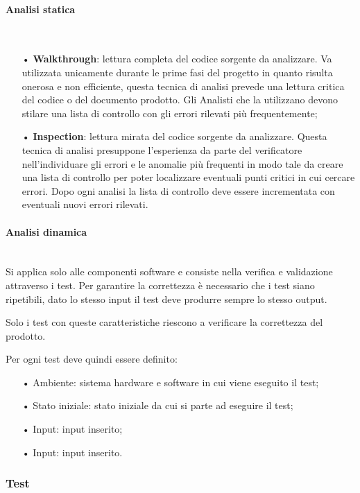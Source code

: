 \paragraph{Analisi statica}\mbox{}\\
\begin{itemize}
\item[•] \textbf{Walkthrough}: lettura completa del codice sorgente da analizzare. Va utilizzata unicamente durante le prime fasi del progetto in quanto risulta onerosa e non efficiente, questa tecnica di analisi prevede una lettura critica del codice o del documento prodotto. Gli Analisti che la utilizzano devono stilare una lista di controllo con gli errori rilevati più frequentemente;
\item[•] \textbf{Inspection}: lettura mirata del codice sorgente da analizzare. Questa tecnica di analisi presuppone l’esperienza da parte del verificatore nell’individuare gli errori e le anomalie più frequenti in modo tale da creare una lista di controllo per poter localizzare eventuali punti critici in cui cercare errori. Dopo ogni analisi la lista di controllo deve essere incrementata con eventuali nuovi errori rilevati.
\end{itemize}

\paragraph{Analisi dinamica}\mbox{}\\
Si applica solo alle componenti software e consiste nella verifica e validazione attraverso i test. Per garantire la correttezza è necessario che i test siano ripetibili, dato lo stesso input il test deve produrre sempre lo stesso output.  

Solo i test con queste caratteristiche riescono a verificare la correttezza del prodotto.

Per ogni test deve quindi essere definito: 
\begin{itemize}
\item[•] Ambiente: sistema hardware e software in cui viene eseguito il test; 
\item[•]Stato iniziale: stato iniziale da cui si parte ad eseguire il test; 
\item[•] Input: input inserito;
\item[•] Input: input inserito.
\end{itemize}

\subsubsection{Test}

